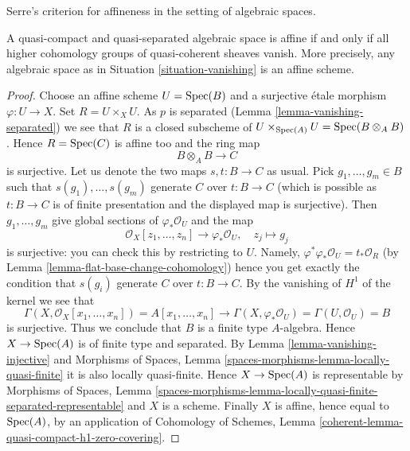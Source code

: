 \begin{proposition}
\label{proposition-vanishing-affine}
\begin{slogan}
Serre's criterion for affineness in the setting of algebraic spaces.
\end{slogan}
A quasi-compact and quasi-separated algebraic space is affine
if and only if all higher cohomology groups of quasi-coherent sheaves
vanish. More precisely, any algebraic space as in
Situation \ref{situation-vanishing} is an affine scheme.
\end{proposition}

\begin{proof}
Choose an affine scheme $U = \mathop{\mathrm{Spec}}(B)$ and a surjective \'etale
morphism $\varphi : U \to X$. Set $R = U \times_X U$. As $p$ is separated
(Lemma \ref{lemma-vanishing-separated}) we see that $R$ is a
closed subscheme of $U \times_{\mathop{\mathrm{Spec}}(A)} U = \mathop{\mathrm{Spec}}(B \otimes_A B)$.
Hence $R = \mathop{\mathrm{Spec}}(C)$ is affine too and the ring map
$$
B \otimes_A B \longrightarrow C
$$
is surjective. Let us denote the two maps $s, t : B \to C$ as usual. Pick
$g_1, \ldots, g_m \in B$ such that $s(g_1), \ldots, s(g_m)$ generate $C$
over $t : B \to C$ (which is possible as $t : B \to C$ is of finite
presentation and the displayed map is surjective). Then $g_1, \ldots, g_m$
give global sections of $\varphi_*\mathcal{O}_U$ and the map
$$
\mathcal{O}_X[z_1, \ldots, z_n] \longrightarrow \varphi_*\mathcal{O}_U,
\quad
z_j \longmapsto g_j
$$
is surjective: you can check this by restricting to $U$.
Namely, $\varphi^*\varphi_*\mathcal{O}_U = t_*\mathcal{O}_R$
(by Lemma \ref{lemma-flat-base-change-cohomology})
hence you get exactly the condition that $s(g_i)$ generate $C$
over $t : B \to C$. By the vanishing of $H^1$ of the kernel we see that
$$
\Gamma(X, \mathcal{O}_X[x_1, \ldots, x_n]) =
A[x_1, \ldots, x_n] \longrightarrow
\Gamma(X, \varphi_*\mathcal{O}_U) = \Gamma(U, \mathcal{O}_U) = B
$$
is surjective. Thus we conclude that $B$ is a finite type $A$-algebra.
Hence $X \to \mathop{\mathrm{Spec}}(A)$ is of finite type and separated.
By Lemma \ref{lemma-vanishing-injective}
and
Morphisms of Spaces, Lemma \ref{spaces-morphisms-lemma-locally-quasi-finite}
it is also locally quasi-finite. Hence $X \to \mathop{\mathrm{Spec}}(A)$ is representable by
Morphisms of Spaces, Lemma
\ref{spaces-morphisms-lemma-locally-quasi-finite-separated-representable}
and $X$ is a scheme. Finally $X$ is affine, hence equal to $\mathop{\mathrm{Spec}}(A)$,
by an application of Cohomology of Schemes, Lemma
\ref{coherent-lemma-quasi-compact-h1-zero-covering}.
\end{proof}

